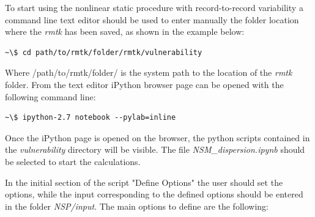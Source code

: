 To start using the nonlinear static procedure with record-to-record variability a command line text editor should be used to enter manually the folder location where the \textit{rmtk} has been saved, as shown in the example below:

\begin{Verbatim}[frame=single, commandchars=\\\{\}, samepage=true]
~\$ cd path/to/rmtk/folder/rmtk/vulnerability
\end{Verbatim}

Where /path/to/rmtk/folder/ is the system path to the location of the \textit{rmtk} folder. From the text editor iPython browser page can be opened with the following command line:

\begin{Verbatim}[frame=single, commandchars=\\\{\}, samepage=true]
~\$ ipython-2.7 notebook --pylab=inline
\end{Verbatim}

Once the iPython page is opened on the browser, the python scripts contained in the \textit{vulnerability} directory will be visible. The file \textit{NSM\_dispersion.ipynb} should be selected to start the calculations.

In the initial section of the script "Define Options" the user should set the options, while the input corresponding to the defined options should be entered in the folder \textit{NSP/input}. The main options to define are the following:


